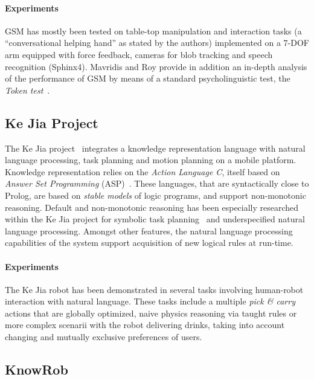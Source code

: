 \documentclass[journal]{IEEEtran}
\begin{document}
\paragraph{Experiments} GSM has mostly been tested on table-top manipulation
and interaction tasks (a ``conversational helping hand'' as stated by the
authors) implemented on a 7-DOF arm equipped with force feedback, cameras for blob
tracking and speech recognition (Sphinx4). Mavridis and Roy provide in addition
an in-depth analysis of the performance of GSM by means of a standard
psycholinguistic test, the \emph{Token test}~\cite{DiSimoni1978}.


\subsection{Ke Jia Project}
\label{sect|kejia}

The Ke Jia project~\cite{Chen2010} integrates a knowledge representation 
language with natural language processing, task planning and motion planning 
on a mobile platform.
% 
Knowledge representation relies on the \emph{Action Language C}, itself based on
\emph{Answer Set Programming} (ASP)~\cite{Gelfond2008}. These languages, that
are syntactically close to Prolog, are based on \emph{stable models} of logic
programs, and support non-monotonic reasoning. Default and non-monotonic
reasoning has been especially researched within the Ke Jia project for symbolic
task planning~\cite{Ji2011} and underspecified natural language processing.
% 
Amongst other features, the natural language processing capabilities of the
system support acquisition of new logical rules at run-time.

\paragraph{Experiments} The Ke Jia robot has been demonstrated in several tasks
involving human-robot interaction with natural language. These tasks include a
multiple \emph{pick \& carry} actions that are globally optimized, naive
physics reasoning via taught rules or more complex scenarii with the robot
delivering drinks, taking into account changing and mutually exclusive
preferences of users.


\subsection{KnowRob}
\label{sect|knowrob}
\end{document}
